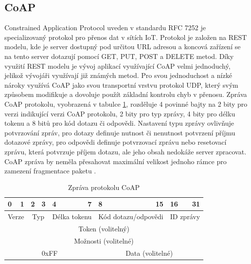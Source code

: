 \subsection{CoAP}
\par Constrained Application Protocol uveden v standardu RFC 7252 je specializovaný protokol pro přenos dat v sítích IoT. Protokol je založen na REST modelu, kde je server dostupný pod určitou URL adresou a koncová zařízení se na tento server dotazují pomocí GET, PUT, POST a DELETE metod. Díky využití REST modelu je vývoj aplikací využívající CoAP velmi jednoduchý, jelikož vývojáři využívají již známých metod. Pro svou jednoduchost a nízké nároky využívá CoAP jako svou transportní vrstvu protokol UDP, který svým způsobem modifikuje a dovoluje použít základní kontrolu chyb v přenosu. Zpráva CoAP protokolu, vyobrazená v tabulce \ref{table:CoAP}, rozděluje 4 povinné bajty na 2 bity pro verzi indikující verzi CoAP protokolu, 2 bity pro typ zprávy, 4 bity pro délku tokenu a 8 bitů pro kód dotazu či odpovědi. Nastavení typu zprávy ovlivňuje potvrzování zpráv, pro dotazy definuje nutnost či nenutnost potvrzení příjmu dotazové zprávy, pro odpovědi definuje potvrzovací zprávu nebo resetovací zprávu, která potvrzuje příjem dotazu, ale jeho obsah nedokáže server zpracovat. CoAP zpráva by neměla přesahovat maximální velikost jednoho rámce pro zamezení fragmentace paketu \cite{Shelby062014, Bormann20142016, Stusek2019}.
    \begin{table}[!h]
    \caption[CoAP zpráva]{Zpráva protokolu CoAP}
    \label{table:CoAP}
    \begin{center}
    \begin{tabular}{|crcrlrcrlr|}
    \hline
    \multicolumn{1}{|l}{0} & \multicolumn{1}{r|}{1} & \multicolumn{1}{r}{2} & \multicolumn{1}{r|}{3} & 4 & \multicolumn{1}{r|}{7} & \multicolumn{1}{l}{8} & \multicolumn{1}{r|}{15} & 16 & 31 \\
    \hline
    \multicolumn{2}{|c|}{Verze} & \multicolumn{2}{c|}{Typ} & \multicolumn{2}{c|}{Délka tokenu} & \multicolumn{2}{c|}{Kód dotazu/odpovědi} & \multicolumn{2}{c|}{ID zprávy} \\
    \hline
    \multicolumn{10}{|c|}{Token (volitelný)} \\
    \hline
    \multicolumn{10}{|c|}{Možnosti (volitelné)} \\
    \hline
    \multicolumn{6}{|c|}{0xFF} & \multicolumn{4}{c|}{Data (volitelné)} \\
    \hline
    \end{tabular}
    \end{center}
    \end{table}
    
